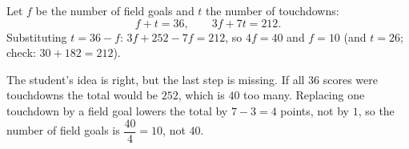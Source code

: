 Let $f$ be the number of field goals and $t$ the number of touchdowns:
\[
f+t=36,\qquad 3f+7t=212 .
\]
Substituting $t=36-f$: $3f+252-7f=212$, so $4f=40$ and $f=\boxed{10}$ (and $t=26$; check: $30+182=212$).

The student's idea is right, but the last step is missing. If all $36$ scores were touchdowns the total would be $252$, which is $40$ too many. Replacing one touchdown by a field goal lowers the total by $7-3=4$ points, not by $1$, so the number of field goals is $\dfrac{40}{4}=10$, not $40$.
